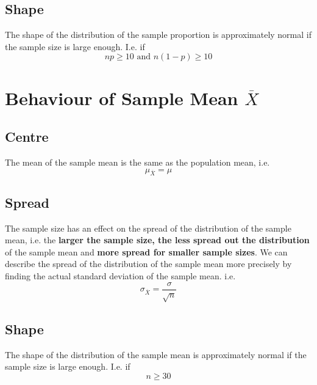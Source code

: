 \documentclass[12pt letter]{report}
\begin{document}
\subsection{Shape}

The shape of the distribution of the sample proportion is approximately normal if the sample size is large enough. I.e.
if
\[
	np \geq 10 \text{ and } n \left( 1 - p \right) \geq 10
\]


\section{Behaviour of Sample Mean $\overline{X}$}

\subsection{Centre}

The mean of the sample mean is the same as the population mean, i.e.
\[
	\mu_{\overline{X}} = \mu
\]

\subsection{Spread}

The sample size has an effect on the spread of the distribution of the sample mean, i.e. the \textbf{larger the sample
	size, the less spread out the distribution} of the sample mean and \textbf{more spread for smaller sample sizes}. We can
describe the spread of the distribution of the sample mean more precisely by finding the actual standard deviation of the
sample mean. i.e.
\[
	\sigma_{\overline{X}} = \frac{\sigma}{\sqrt{n}}

\]

\subsection{Shape}

The shape of the distribution of the sample mean is approximately normal if the sample size is large enough. I.e. if
\[
	n \geq 30
\]

\end{document}
